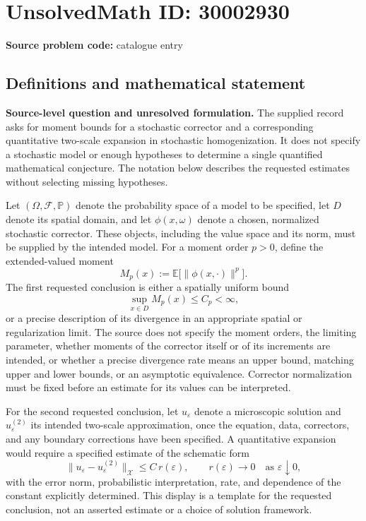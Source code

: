 \documentclass[11pt]{article}
\begin{document}
\section*{UnsolvedMath ID: 30002930}
\textbf{Source problem code:} catalogue entry
\subsection{Definitions and mathematical statement}
\textbf{Source-level question and unresolved formulation.} The supplied record asks for moment bounds for a stochastic corrector and a corresponding quantitative two-scale expansion in stochastic homogenization. It does not specify a stochastic model or enough hypotheses to determine a single quantified mathematical conjecture. The notation below describes the requested estimates without selecting missing hypotheses.

Let \((\Omega,\mathcal F,\mathbb P)\) denote the probability space of a model to be specified, let \(D\) denote its spatial domain, and let \(\phi(x,\omega)\) denote a chosen, normalized stochastic corrector. These objects, including the value space and its norm, must be supplied by the intended model. For a moment order \(p>0\), define the extended-valued moment
\[
M_p(x):=\mathbb E\bigl[\|\phi(x,\cdot)\|^p\bigr].
\]
The first requested conclusion is either a spatially uniform bound
\[
\sup_{x\in D}M_p(x)\le C_p<\infty,
\]
or a precise description of its divergence in an appropriate spatial or regularization limit. The source does not specify the moment orders, the limiting parameter, whether moments of the corrector itself or of its increments are intended, or whether a precise divergence rate means an upper bound, matching upper and lower bounds, or an asymptotic equivalence. Corrector normalization must be fixed before an estimate for its values can be interpreted.

For the second requested conclusion, let \(u_\varepsilon\) denote a microscopic solution and \(u_\varepsilon^{(2)}\) its intended two-scale approximation, once the equation, data, correctors, and any boundary corrections have been specified. A quantitative expansion would require a specified estimate of the schematic form
\[
\|u_\varepsilon-u_\varepsilon^{(2)}\|_{\mathcal X}
\le C\,r(\varepsilon),
\qquad r(\varepsilon)\longrightarrow0
\quad\text{as }\varepsilon\downarrow0,
\]
with the error norm, probabilistic interpretation, rate, and dependence of the constant explicitly determined. This display is a template for the requested conclusion, not an asserted estimate or a choice of solution framework.
\end{document}
